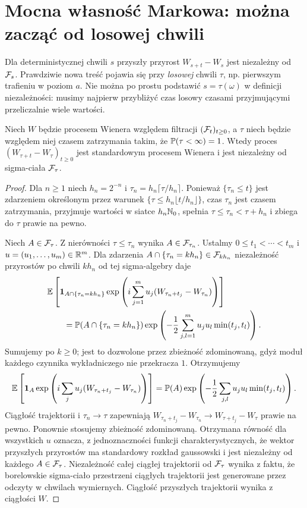 \section{Mocna własność Markowa: można zacząć od losowej chwili}
Dla deterministycznej chwili $s$ przyszły przyrost
$W_{s+t}-W_s$ jest niezależny od $\mathcal{F}_s$.
Prawdziwie nowa treść pojawia się przy \emph{losowej}
chwili $\tau$, np. pierwszym trafieniu w poziom $a$.
Nie można po prostu podstawić $s=\tau(\omega)$ w definicji
niezależności: musimy najpierw przybliżyć czas losowy
czasami przyjmującymi przeliczalnie wiele wartości.

\begin{twierdzenie}
Niech $W$ będzie procesem Wienera względem filtracji
$(\mathcal{F}_t)_{t\ge0}$, a $\tau$ niech będzie względem niej
czasem zatrzymania takim, że $\mathbb{P}(\tau<\infty)=1$.
Wtedy proces $(W_{\tau+t}-W_\tau)_{t\ge0}$ jest
standardowym procesem Wienera i jest niezależny od
sigma-ciała $\mathcal{F}_\tau$.
\end{twierdzenie}
\begin{proof}
Dla $n\ge1$ niech $h_n=2^{-n}$ i
$\tau_n=h_n\lceil\tau/h_n\rceil$.
Ponieważ $\{\tau_n\le t\}$ jest zdarzeniem określonym
przez warunek $\{\tau\le h_n\lfloor t/h_n\rfloor\}$,
czas $\tau_n$ jest czasem zatrzymania, przyjmuje wartości
w siatce $h_n\mathbb{N}_0$, spełnia $\tau\le\tau_n<\tau+h_n$
i zbiega do $\tau$ prawie na pewno.

Niech $A\in\mathcal{F}_\tau$. Z nierówności $\tau\le\tau_n$
wynika $A\in\mathcal{F}_{\tau_n}$. Ustalmy
$0\le t_1<\cdots<t_m$ i $u=(u_1,\ldots,u_m)\in\mathbb{R}^m$.
Dla zdarzenia $A\cap\{\tau_n=kh_n\}\in\mathcal{F}_{kh_n}$
niezależność przyrostów po chwili $kh_n$ od tej
sigma-algebry daje
\begin{align*}
&\mathbb{E}\left[\mathbf{1}_{A\cap\{\tau_n=kh_n\}}
\exp\left(i\sum_{j=1}^m u_j(W_{\tau_n+t_j}-W_{\tau_n})\right)\right]\\
&\qquad=\mathbb{P}(A\cap\{\tau_n=kh_n\})
\exp\left(-\frac12\sum_{j,l=1}^m u_ju_l\min(t_j,t_l)\right).
\end{align*}
Sumujemy po $k\ge0$; jest to dozwolone przez
zbieżność zdominowaną, gdyż moduł każdego czynnika
wykładniczego nie przekracza $1$. Otrzymujemy
\[
\mathbb{E}\left[\mathbf{1}_{A}\exp\left(i\sum_j u_j
(W_{\tau_n+t_j}-W_{\tau_n})\right)\right]
=\mathbb{P}(A)\exp\left(-\frac12\sum_{j,l}
 u_ju_l\min(t_j,t_l)\right).
\]
Ciągłość trajektorii i $\tau_n\to\tau$ zapewniają
$W_{\tau_n+t_j}-W_{\tau_n}\to W_{\tau+t_j}-W_\tau$
prawie na pewno. Ponownie stosujemy zbieżność zdominowaną.
Otrzymana równość dla wszystkich $u$ oznacza, z jednoznaczności
funkcji charakterystycznych, że wektor przyszłych przyrostów
ma standardowy rozkład gaussowski i jest niezależny
od każdego $A\in\mathcal{F}_\tau$. Niezależność
całej ciągłej trajektorii od $\mathcal{F}_\tau$ wynika z faktu,
że borelowskie sigma-ciało przestrzeni ciągłych trajektorii
jest generowane przez odczyty w chwilach wymiernych.
Ciągłość przyszłych trajektorii wynika z ciągłości $W$.
\end{proof}

